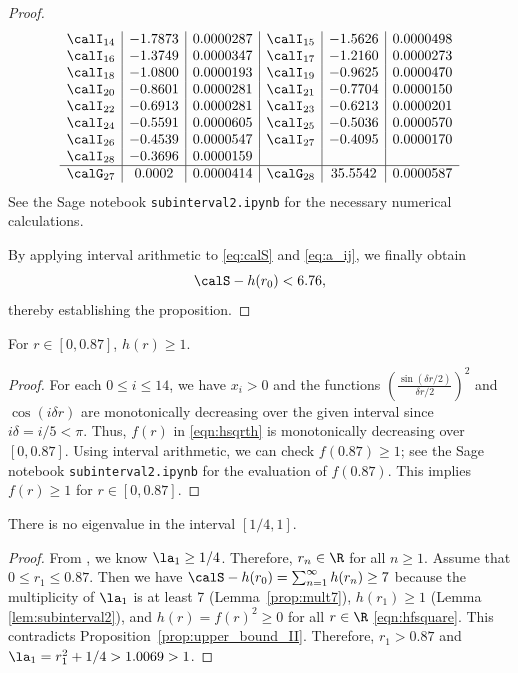 \begin{proof}
\[\begin{array}{c|c|c|c|c|c}
\calI_{14} & -1.7873 & 0.0000287 & \calI_{15} & -1.5626 & 0.0000498 \\
\calI_{16} & -1.3749 & 0.0000347 & \calI_{17} & -1.2160 & 0.0000273 \\
\calI_{18} & -1.0800 & 0.0000193 & \calI_{19} & -0.9625 & 0.0000470 \\
\calI_{20} & -0.8601 & 0.0000281 & \calI_{21} & -0.7704 & 0.0000150 \\
\calI_{22} & -0.6913 & 0.0000281 & \calI_{23} & -0.6213 & 0.0000201 \\
\calI_{24} & -0.5591 & 0.0000605 & \calI_{25} & -0.5036 & 0.0000570 \\
\calI_{26} & -0.4539 & 0.0000547 & \calI_{27} & -0.4095 & 0.0000170 \\
\calI_{28} & -0.3696 & 0.0000159 & & & \\
\hline
\calG_{27} & 0.0002 & 0.0000414 & \calG_{28} & 35.5542 & 0.0000587 \\
\end{array}
\]
See the Sage notebook \texttt{subinterval2.ipynb} for the necessary numerical calculations.

By applying interval arithmetic to \eqref{eq:calS} and \eqref{eq:a_ij}, we finally obtain
\[
\calS- h(r_0) < 6.76,
\]
thereby establishing the proposition.
\end{proof}

\begin{lemma}\label{lem:subinterval2}
For $r\in [0,0.87]$, $h(r)\geq 1$.    
\end{lemma}

\begin{proof}
For each $0\leq i\leq 14$,
we have $x_i>0$ and
the functions
$\left(\frac{\sin(\delta r / 2)}{\delta r / 2}\right)^{2}$ 
and $\cos(i\delta r)$ are monotonically decreasing over the given interval since
$i\delta = i/5 < \pi$.
Thus, $f(r)$ in \eqref{eqn:hsqrth} is monotonically decreasing over $[0,0.87]$.
Using interval arithmetic, we can check $f(0.87)\geq 1$;
see the Sage notebook \texttt{subinterval2.ipynb} for the evaluation of $f(0.87)$.
This implies $f(r)\geq 1$ for $r\in [0,0.87]$.
\end{proof}

\begin{prop}\label{prop:subinterval2}
There is no eigenvalue in the interval $[1/4,1]$.
\end{prop}
\begin{proof}
From , we know $\la_1\geq 1/4$.
Therefore, $r_n\in \R$ for all $n\geq 1$.
Assume that $0\leq r_1 \leq 0.87$.
Then we have $\calS-h(r_0)=\sum_{n=1}^{\infty} h(r_n)\geq 7$ because the multiplicity of $\la_1$ is at least 7 (Lemma~\ref{prop:mult7}), $h(r_1)\geq 1$ (Lemma \ref{lem:subinterval2}), and $h(r)=f(r)^2\geq 0$ for all $r\in \R$ \eqref{eqn:hfsquare}.
This contradicts Proposition~\ref{prop:upper_bound_II}.
Therefore, $r_1 > 0.87$ and $\la_1 = r_1^2+1/4>1.0069>1$.
\end{proof}


